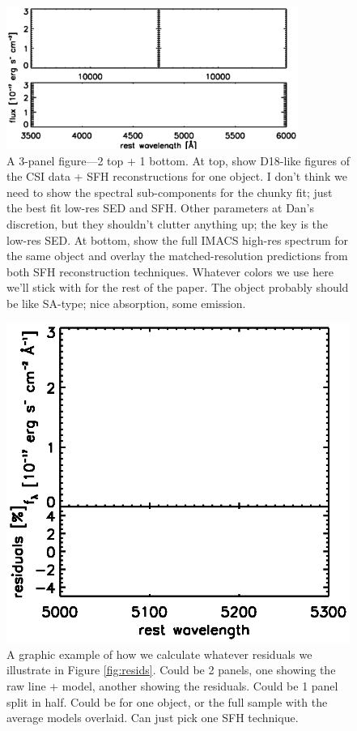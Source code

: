 \documentclass[a4paper,fleqn,usenatbib]{mnras}
\newcommand{\bfb}{\color{myblue}}
\begin{document}
\begin{figure}
	\centering
	\includegraphics[width=0.85\textwidth]{scheme}
	\caption{\bfb A 3-panel figure---2 top + 1 bottom. At top, show D18-like figures of the CSI
			data + SFH reconstructions for one object. I don't think we need to show the spectral
			sub-components for the chunky fit; just the best fit low-res SED and SFH. Other parameters
			at Dan's discretion, but they shouldn't clutter anything up; the key is the low-res SED.
			At bottom, show the full IMACS high-res spectrum for the same object and overlay the
			matched-resolution predictions from both SFH reconstruction techniques. Whatever
			colors we use here we'll stick with for the rest of the paper. The object probably should
			be like SA-type; nice absorption, some emission.}
	\label{fig:scheme}
\end{figure}

\begin{figure}
	\centering
	\includegraphics[width = \columnwidth, trim = 0cm 0.7cm 0cm 0cm]{metric}
	\caption{\bfb A graphic example of how we calculate whatever residuals we illustrate
			in Figure \ref{fig:resids}. Could be 2 panels, one showing the raw line + model,
			another showing the residuals. Could be 1 panel split in half. Could be for one
			object, or the full sample with the average models overlaid. Can just pick one
			SFH technique.}
	\label{fig:metric}
\end{figure}
\end{document}

